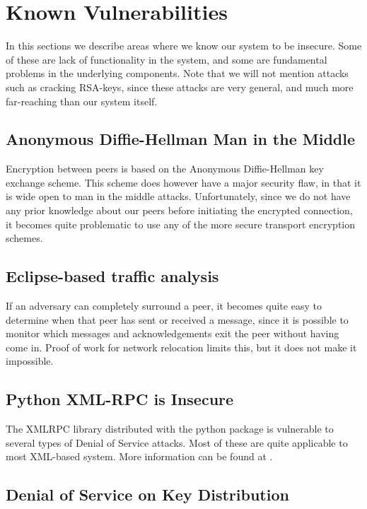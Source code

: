 \section{Known Vulnerabilities}

In this sections we describe areas where we know our system to be insecure. Some of these are lack of functionality in the system, and some are fundamental problems in the underlying components. Note that we will not mention attacks such as cracking RSA-keys, since these attacks are very general, and much more far-reaching than our system itself.

\subsection{Anonymous Diffie-Hellman Man in the Middle}

Encryption between peers is based on the Anonymous Diffie-Hellman key exchange scheme. This scheme does however have a major security flaw, in that it is wide open to man in the middle attacks. Unfortunately, since we do not have any prior knowledge about our peers before initiating the encrypted connection, it becomes quite problematic to use any of the more secure transport encryption schemes.

\subsection{Eclipse-based traffic analysis}

If an adversary can completely surround a peer, it becomes quite easy to determine when that peer has sent or received a message, since it is possible to monitor which messages and acknowledgements exit the peer without having come in.
Proof of work for network relocation limits this, but it does not make it impossible.

\subsection{Python XML-RPC is Insecure}

The XMLRPC library distributed with the python package is vulnerable to several types of Denial of Service attacks. Most of these are quite applicable to most XML-based system. More information can be found at \citep{XMLRPCBAD}.

\subsection{Denial of Service on Key Distribution}


